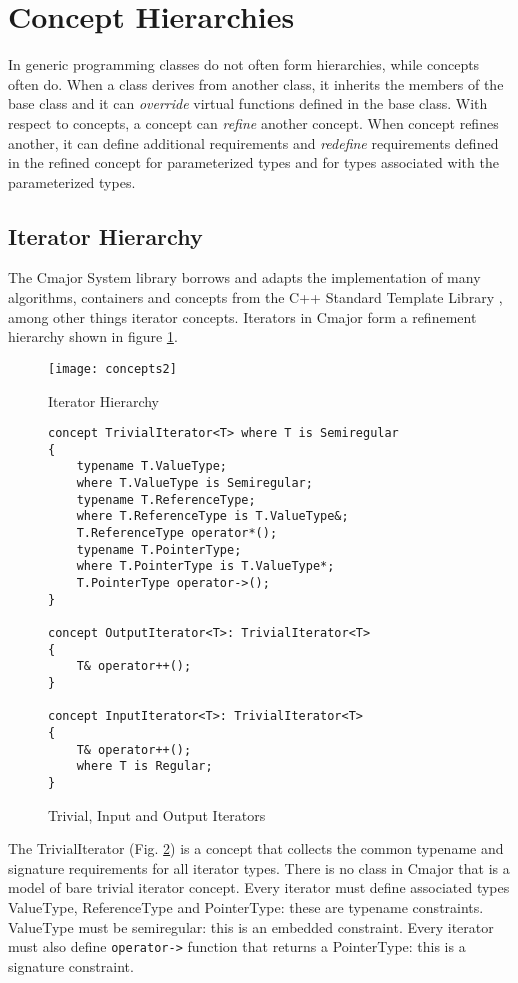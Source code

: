 \documentclass[oneside, a4paper, 11pt]{article}
\begin{document}
\section{Concept Hierarchies}

In generic programming classes do not often form hierarchies, while concepts often do.
When a class derives from another class, it inherits the members of the base class and it can
\emph{override} virtual functions defined in the base class.
With respect to concepts, a concept can \emph{refine} another concept.
When concept refines another, it can define additional requirements and \emph{redefine}
requirements defined in the refined concept for parameterized types and for types
associated with the parameterized types.

\subsection{Iterator Hierarchy}

The Cmajor System library borrows and adapts the implementation of many algorithms, containers and concepts from
the C++ Standard Template Library \cite{STL}, among other things iterator concepts.
Iterators in Cmajor form a refinement hierarchy shown in figure \ref{fig:iteratorhierarchy}.

\begin{figure}[htb]
\caption{Iterator Hierarchy}
\label{fig:iteratorhierarchy}
\vspace{0.5cm}
\texttt{[image: concepts2]}
\end{figure}

\begin{figure}[htb]\caption{Trivial, Input and Output Iterators}
\label{fig:trivioiterators}
\begin{lstlisting}[frame=trBL]
concept TrivialIterator<T> where T is Semiregular
{
    typename T.ValueType;
    where T.ValueType is Semiregular;
    typename T.ReferenceType;
    where T.ReferenceType is T.ValueType&;
    T.ReferenceType operator*();
    typename T.PointerType;
    where T.PointerType is T.ValueType*;
    T.PointerType operator->();
}

concept OutputIterator<T>: TrivialIterator<T>
{
    T& operator++();
}

concept InputIterator<T>: TrivialIterator<T>
{
    T& operator++();
    where T is Regular;
}
\end{lstlisting}
\end{figure}

The TrivialIterator (Fig. \ref{fig:trivioiterators}) is a concept that collects
the common typename and signature requirements for all iterator types.
There is no class in Cmajor that is a model of bare trivial iterator concept.
Every iterator must define associated types ValueType, ReferenceType and
PointerType: these are typename constraints.
ValueType must be semiregular: this is an embedded constraint.
Every iterator must also define \verb|operator->| function that
returns a PointerType: this is a signature constraint.
\end{document}
